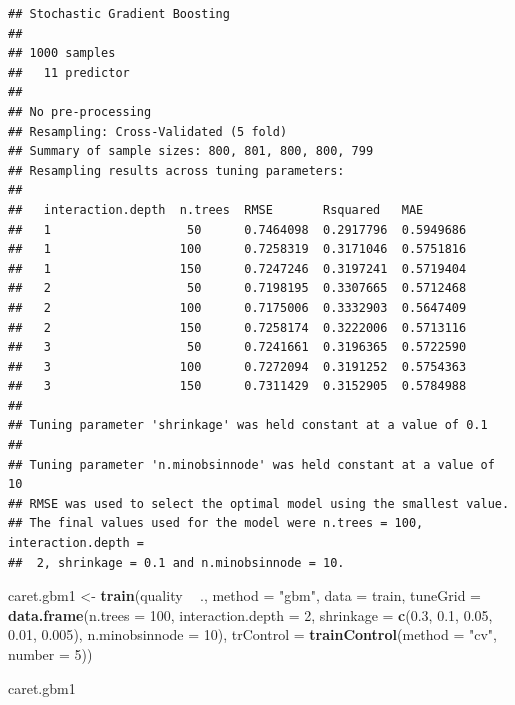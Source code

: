 \documentclass[
  spanish,
]{book}
\newenvironment{Shaded}{\begin{snugshade}}{\end{snugshade}}
\newcommand{\DataTypeTok}[1]{\textcolor[rgb]{0.13,0.29,0.53}{#1}}
\newcommand{\DecValTok}[1]{\textcolor[rgb]{0.00,0.00,0.81}{#1}}
\newcommand{\FloatTok}[1]{\textcolor[rgb]{0.00,0.00,0.81}{#1}}
\newcommand{\KeywordTok}[1]{\textcolor[rgb]{0.13,0.29,0.53}{\textbf{#1}}}
\newcommand{\NormalTok}[1]{#1}
\newcommand{\OperatorTok}[1]{\textcolor[rgb]{0.81,0.36,0.00}{\textbf{#1}}}
\newcommand{\StringTok}[1]{\textcolor[rgb]{0.31,0.60,0.02}{#1}}
\theoremstyle{break}
\theoremstyle{definition}
\theoremstyle{definition}
\theoremstyle{definition}
\theoremstyle{remark}
\begin{document}
\begin{verbatim}
## Stochastic Gradient Boosting 
## 
## 1000 samples
##   11 predictor
## 
## No pre-processing
## Resampling: Cross-Validated (5 fold) 
## Summary of sample sizes: 800, 801, 800, 800, 799 
## Resampling results across tuning parameters:
## 
##   interaction.depth  n.trees  RMSE       Rsquared   MAE      
##   1                   50      0.7464098  0.2917796  0.5949686
##   1                  100      0.7258319  0.3171046  0.5751816
##   1                  150      0.7247246  0.3197241  0.5719404
##   2                   50      0.7198195  0.3307665  0.5712468
##   2                  100      0.7175006  0.3332903  0.5647409
##   2                  150      0.7258174  0.3222006  0.5713116
##   3                   50      0.7241661  0.3196365  0.5722590
##   3                  100      0.7272094  0.3191252  0.5754363
##   3                  150      0.7311429  0.3152905  0.5784988
## 
## Tuning parameter 'shrinkage' was held constant at a value of 0.1
## 
## Tuning parameter 'n.minobsinnode' was held constant at a value of 10
## RMSE was used to select the optimal model using the smallest value.
## The final values used for the model were n.trees = 100, interaction.depth =
##  2, shrinkage = 0.1 and n.minobsinnode = 10.
\end{verbatim}

\begin{Shaded}
\begin{Highlighting}[]
\NormalTok{caret.gbm1 <-}\StringTok{ }\KeywordTok{train}\NormalTok{(quality }\OperatorTok{~}\StringTok{ }\NormalTok{., }\DataTypeTok{method =} \StringTok{"gbm"}\NormalTok{, }\DataTypeTok{data =}\NormalTok{ train,}
   \DataTypeTok{tuneGrid =} \KeywordTok{data.frame}\NormalTok{(}\DataTypeTok{n.trees =}  \DecValTok{100}\NormalTok{, }\DataTypeTok{interaction.depth =} \DecValTok{2}\NormalTok{, }
                        \DataTypeTok{shrinkage =} \KeywordTok{c}\NormalTok{(}\FloatTok{0.3}\NormalTok{, }\FloatTok{0.1}\NormalTok{, }\FloatTok{0.05}\NormalTok{, }\FloatTok{0.01}\NormalTok{, }\FloatTok{0.005}\NormalTok{),}
                        \DataTypeTok{n.minobsinnode =} \DecValTok{10}\NormalTok{),}
   \DataTypeTok{trControl =} \KeywordTok{trainControl}\NormalTok{(}\DataTypeTok{method =} \StringTok{"cv"}\NormalTok{, }\DataTypeTok{number =} \DecValTok{5}\NormalTok{))}
\end{Highlighting}
\end{Shaded}

\begin{Shaded}
\begin{Highlighting}[]
\NormalTok{caret.gbm1}
\end{Highlighting}
\end{Shaded}
\end{document}
